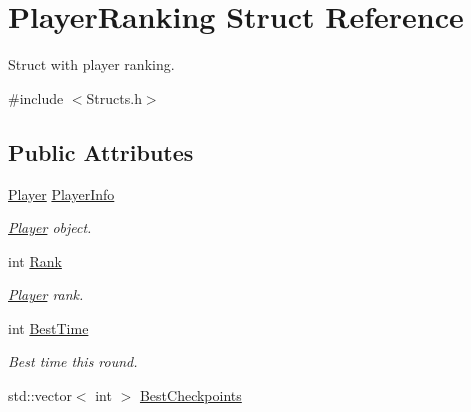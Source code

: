 \hypertarget{structPlayerRanking}{\section{Player\-Ranking Struct Reference}
\label{structPlayerRanking}
}


Struct with player ranking.  




{\ttfamily \#include $<$Structs.\-h$>$}

\subsection*{Public Attributes}
\begin{DoxyCompactItemize}
\item 
\hypertarget{structPlayerRanking_ac2e7a00a8f6c491765020b5c1b1fc032}{\hyperlink{structPlayer}{Player} \hyperlink{structPlayerRanking_ac2e7a00a8f6c491765020b5c1b1fc032}{Player\-Info}}\label{structPlayerRanking_ac2e7a00a8f6c491765020b5c1b1fc032}

\begin{DoxyCompactList}\small\item\em \hyperlink{structPlayer}{Player} object. \end{DoxyCompactList}\item 
\hypertarget{structPlayerRanking_a2a24769e93ee152b144ee693c60485ee}{int \hyperlink{structPlayerRanking_a2a24769e93ee152b144ee693c60485ee}{Rank}}\label{structPlayerRanking_a2a24769e93ee152b144ee693c60485ee}

\begin{DoxyCompactList}\small\item\em \hyperlink{structPlayer}{Player} rank. \end{DoxyCompactList}\item 
\hypertarget{structPlayerRanking_a3e2a345a7d19a773595d0cda7b80e78c}{int \hyperlink{structPlayerRanking_a3e2a345a7d19a773595d0cda7b80e78c}{Best\-Time}}\label{structPlayerRanking_a3e2a345a7d19a773595d0cda7b80e78c}

\begin{DoxyCompactList}\small\item\em Best time this round. \end{DoxyCompactList}\item 
\hypertarget{structPlayerRanking_ac99c1cb46e365b719b894d1718567324}{std\-::vector$<$ int $>$ \hyperlink{structPlayerRanking_ac99c1cb46e365b719b894d1718567324}{Best\-Checkpoints}}\label{structPlayerRanking_ac99c1cb46e365b719b894d1718567324}


\end{DoxyCompactItemize}
